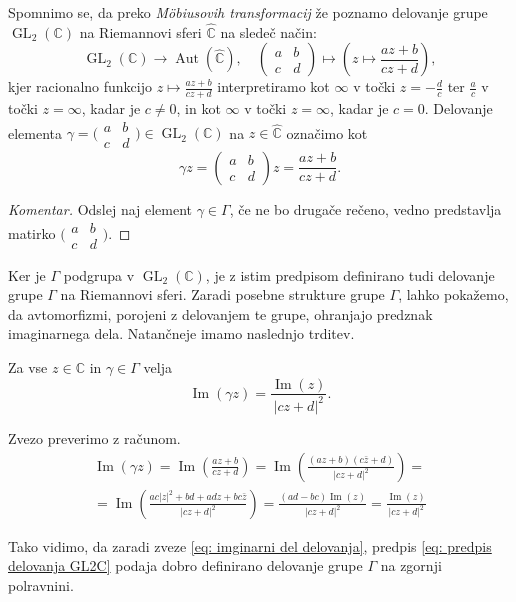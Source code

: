 \documentclass[mat1]{fmfdelo}
\numberwithin{equation}{section}
\newcommand{\C}{\mathbb C}
\newcommand{\RS}{\widehat{\C}}
\newcommand{\SL}{\Gamma}
\newcommand{\abcd}{\big(\begin{smallmatrix} a & b\\c & d \end{smallmatrix}\big)}
\newcommand{\pabcd}{\begin{pmatrix} a & b \\ c & d \end{pmatrix}}
\newcommand{\abs}[1]{\left\lvert #1 \right\rvert}
\renewcommand\Im{\operatorname{Im}}%
\DeclareMathOperator{\GL}{GL}
\DeclareMathOperator{\Aut}{Aut}
\theoremstyle{definition}
\newenvironment{komentar}[1][Komentar]{\begin{proof}[#1]\let\qed\relax}{\end{proof}}
\begin{document}
Spomnimo se, da preko \emph{Möbiusovih transformacij} že poznamo delovanje grupe $\GL_2(\C)$ na Riemannovi sferi $\RS$ na sledeč način:
\begin{equation}
    \label{eq: delovanje GL2C na CP1}
    \GL_2(\C) \to \Aut(\RS), \quad \pabcd \mapsto \left(z \mapsto \frac{az + b}{cz + d}\right),
\end{equation}
kjer racionalno funkcijo $z\mapsto\frac{az + b}{cz + d}$ interpretiramo kot $\infty$ v točki $z = -\frac{d}{c}$ ter $\frac{a}{c}$ v točki $z = \infty$, kadar je $c \neq 0$, in kot $\infty$ v točki $z = \infty$, kadar je $c = 0$. Delovanje elementa $\gamma = \abcd \in \GL_2(\C)$ na $z \in \RS$ označimo kot
\begin{equation}
    \label{eq: predpis delovanja GL2C}
    \gamma z =  \pabcd z = \frac{az + b}{cz + d}.
\end{equation}
\begin{komentar}
    Odslej naj element $\gamma \in \SL$, če ne bo drugače rečeno, vedno predstavlja matirko $\abcd$.
\end{komentar}
Ker je $\SL$ podgrupa v $\GL_2(\C)$, je z istim predpisom definirano tudi delovanje grupe $\SL$ na Riemannovi sferi. Zaradi posebne strukture grupe $\SL$, lahko pokažemo, da avtomorfizmi, porojeni z delovanjem te grupe, ohranjajo predznak imaginarnega dela. Natančneje imamo naslednjo trditev.

\begin{trditev}
    Za vse $z \in \C$ in $\gamma \in \SL$ velja 
    \begin{equation}
        \label{eq: imginarni del delovanja}
        \Im(\gamma z) = \frac{\Im(z)}{\abs{cz + d}^2}.
    \end{equation} 
\end{trditev} 

\begin{dokaz}
Zvezo preverimo z računom.
\begin{multline*}
    \Im(\gamma z) = 
    \Im\left(\frac{az + b}{cz + d}\right) = 
    \Im\left(\frac{(az + b)(c\bar{z} + d)}{\abs{cz + d}^2}\right) = \\
    = \Im\left(\frac{ac\abs{z}^2 + bd + adz + bc\bar{z}}{\abs{cz + d}^2}\right) = 
    \frac{(ad - bc)\Im(z)}{\abs{cz + d}^2} = \frac{\Im(z)}{\abs{cz + d}^2}
\end{multline*}
\end{dokaz}
\begin{opomba}
    Tako vidimo, da zaradi zveze \eqref{eq: imginarni del delovanja}, predpis \eqref{eq: predpis delovanja GL2C} podaja dobro definirano delovanje grupe $\SL$ na zgornji polravnini.
\end{opomba}
\end{document}
